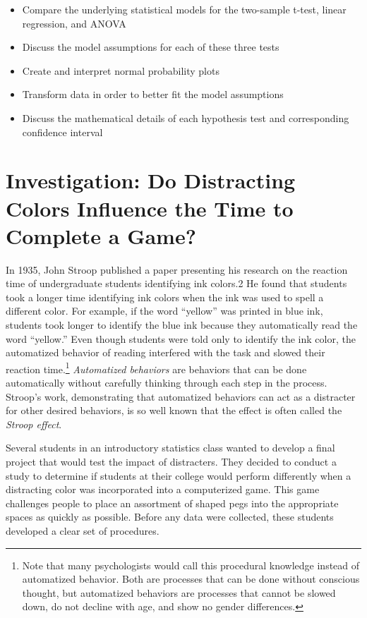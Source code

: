 \documentclass[
]{report}
\providecommand{\tightlist}{%
  \setlength{\itemsep}{0pt}\setlength{\parskip}{0pt}}
\begin{document}
\begin{itemize}
\tightlist
\item
  Compare the underlying statistical models for the two-sample t-test, linear regression, and
  ANOVA
\item
  Discuss the model assumptions for each of these three tests
\item
  Create and interpret normal probability plots
\item
  Transform data in order to better fit the model assumptions
\item
  Discuss the mathematical details of each hypothesis test and corresponding confidence interval
\end{itemize}

\newpage

\section{Investigation: Do Distracting Colors Influence the Time to Complete a Game?}\label{investigation-do-distracting-colors-influence-the-time-to-complete-a-game}

In 1935, John Stroop published a paper presenting his research on the reaction time of undergraduate students identifying ink colors.2 He found that students took a longer time identifying ink colors when the ink was used to spell a different color. For example, if the word ``\color{blue}yellow\color{black}'' was printed in blue ink, students took longer to identify the blue ink because they automatically read the word ``yellow.'' Even though students were told only to identify the ink color, the automatized behavior of reading interfered with the task and slowed their reaction time.\footnote{Note that many psychologists would call this procedural knowledge instead of automatized behavior. Both are processes that can be done without conscious thought, but automatized behaviors are processes that cannot be slowed down, do not
  decline with age, and show no gender differences.} \emph{Automatized behaviors} are behaviors that can be done automatically without carefully thinking through each step in the process. Stroop's work, demonstrating that automatized behaviors can act as a distracter for other desired behaviors, is so well known that the effect is often called the \emph{Stroop effect}.

Several students in an introductory statistics class wanted to develop a final project that would test the impact of distracters. They decided to conduct a study to determine if students at their college would perform differently when a distracting color was incorporated into a computerized game. This game challenges people to place an assortment of shaped pegs into the appropriate spaces as quickly as possible. Before any data were collected, these students developed a clear set of procedures.
\end{document}
